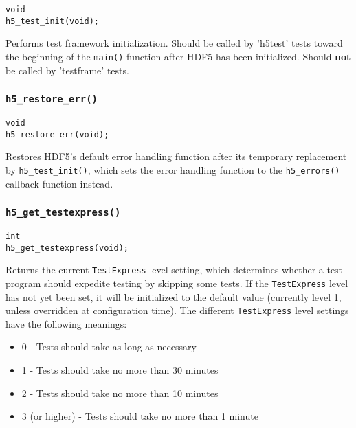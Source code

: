 \documentclass[../HDF5_RFC.tex]{subfiles}
\begin{document}
\begin{verbatim}
void
h5_test_init(void);
\end{verbatim}

Performs test framework initialization. Should be called by 'h5test' tests toward the beginning of the \texttt{main()} function after HDF5 has been initialized. Should \textbf{not} be called by 'testframe'
tests.

\subsubsection{\texttt{h5\_restore\_err()}}

\begin{verbatim}
void
h5_restore_err(void);
\end{verbatim}

Restores HDF5's default error handling function after its temporary replacement by
\texttt{h5\_test\_init()}, which sets the error handling function to the \texttt{h5\_errors()}
callback function instead.

\subsubsection{\texttt{h5\_get\_testexpress()}}
\label{apdx:h5test_h5gettestexpress}

\begin{verbatim}
int
h5_get_testexpress(void);
\end{verbatim}

Returns the current \texttt{TestExpress} level setting, which determines whether a test program should
expedite testing by skipping some tests. If the \texttt{TestExpress} level has not yet been set, it will
be initialized to the default value (currently level 1, unless overridden at configuration time). The
different \texttt{TestExpress} level settings have the following meanings:

\begin{itemize}

    \item 0 - Tests should take as long as necessary
    \item 1 - Tests should take no more than 30 minutes
    \item 2 - Tests should take no more than 10 minutes
    \item 3 (or higher) - Tests should take no more than 1 minute

\end{itemize}
\end{document}
